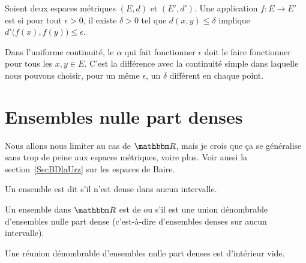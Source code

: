 \begin{definition}\label{DEFooYIPXooQTscbG}
    Soient deux espaces métriques \( (E,d)\) et \( (E',d')\). Une application \( f\colon E\to E'\) est  si pour tout \( \epsilon>0\), il existe \( \delta>0\) tel que \( d(x,y)\leq \delta\) implique \( d'\big( f(x),f(y) \big)\leq \epsilon\).
\end{definition}
Dans l'uniforme continuité, le \( \alpha\) qui fait fonctionner \( \epsilon\) doit le faire fonctionner pour tous les \( x,y\in E\). C'est la différence avec la continuité simple dans laquelle nous pouvons choisir, pour un même \( \epsilon\), un \( \delta\) différent en chaque point.

\section{Ensembles nulle part denses}

Nous allons nous limiter au cas de \( \eR\), mais je crois que ça se généralise sans trop de peine aux espaces métriques, voire plus. Voir aussi la section~\ref{SecBDlaUrz} sur les espaces de Baire.

\begin{definition}
    Un ensemble est dit  s'il n'est dense dans aucun intervalle.

    Un ensemble dans \( \eR\) est de  ou  s'il est une union dénombrable d'ensembles nulle part dense (c'est-à-dire d'ensembles denses sur aucun intervalle).
\end{definition}

\begin{theorem}      \label{ThoQGalIO}
    Une réunion dénombrable d'ensembles nulle part denses est d'intérieur vide.
\end{theorem}


